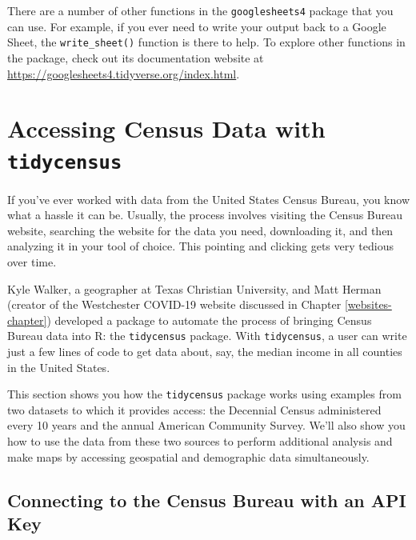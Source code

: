 \documentclass[
]{book}
\begin{document}
There are a number of other functions in the \texttt{googlesheets4} package that you can use. For example, if you ever need to write your output back to a Google Sheet, the \texttt{write\_sheet()} function is there to help. To explore other functions in the package, check out its documentation website at \url{https://googlesheets4.tidyverse.org/index.html}.

\hypertarget{accessing-census-data-with-tidycensus}{%
\section*{\texorpdfstring{Accessing Census Data with \texttt{tidycensus}}{Accessing Census Data with tidycensus}}\label{accessing-census-data-with-tidycensus}}

If you've ever worked with data from the United States Census Bureau, you know what a hassle it can be. Usually, the process involves visiting the Census Bureau website, searching the website for the data you need, downloading it, and then analyzing it in your tool of choice. This pointing and clicking gets very tedious over time.

Kyle Walker, a geographer at Texas Christian University, and Matt Herman (creator of the Westchester COVID-19 website discussed in Chapter \ref{websites-chapter}) developed a package to automate the process of bringing Census Bureau data into R: the \texttt{tidycensus} package. With \texttt{tidycensus}, a user can write just a few lines of code to get data about, say, the median income in all counties in the United States.

This section shows you how the \texttt{tidycensus} package works using examples from two datasets to which it provides access: the Decennial Census administered every 10 years and the annual American Community Survey. We'll also show you how to use the data from these two sources to perform additional analysis and make maps by accessing geospatial and demographic data simultaneously.

\hypertarget{connecting-to-the-census-bureau-with-an-api-key}{%
\subsection*{Connecting to the Census Bureau with an API Key}\label{connecting-to-the-census-bureau-with-an-api-key}}
\end{document}
